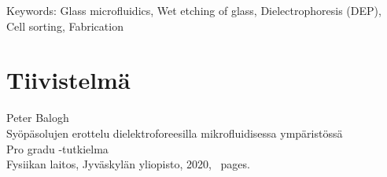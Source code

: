 \documentclass[final]{jyflluk}
\begin{document}
\noindent Keywords: Glass microfluidics, Wet etching of glass, Dielectrophoresis (DEP), Cell sorting, Fabrication

\section*{Tiivistelmä}

Peter Balogh\\
Syöpäsolujen erottelu dielektroforeesilla mikrofluidisessa ympäristössä  \\
Pro gradu -tutkielma \\
Fysiikan laitos, Jyväskylän yliopisto, 2020, \pageref{LastPage}~pages.

\bigskip
\end{document}
